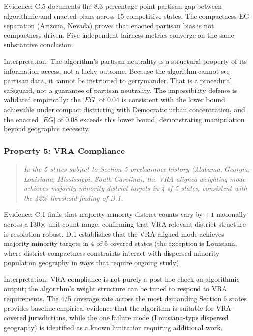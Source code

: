 Evidence: C.5 documents the $8.3$ percentage-point partisan gap
between algorithmic and enacted plans across 15 competitive states.
The compactness-EG separation (Arizona, Nevada) proves that enacted
partisan bias is not compactness-driven. Five independent fairness
metrics converge on the same substantive conclusion.

Interpretation: The algorithm's partisan neutrality is a structural
property of its information access, not a lucky outcome. Because the
algorithm cannot see partisan data, it cannot be instructed to gerrymander. That is a
procedural safeguard, not a guarantee of partisan neutrality. The
impossibility defense \citep{b1paper} is validated empirically: the
$|EG|$ of $0.04$ is consistent with the lower bound achievable under
compact districting with Democratic urban concentration, and the
enacted $|EG|$ of $0.08$ exceeds this lower bound, demonstrating
manipulation beyond geographic necessity.

\subsubsection{Property 5: VRA Compliance}

\begin{quote}
\textit{In the 5 states subject to Section 5 preclearance history
(Alabama, Georgia, Louisiana, Mississippi, South Carolina), the
VRA-aligned weighting mode achieves majority-minority district targets
in 4 of 5 states, consistent with the 42\% threshold finding of D.1.}
\end{quote}

Evidence: C.1 finds that majority-minority district counts vary by
$\pm 1$ nationally across a 130$\times$ unit-count range, confirming
that VRA-relevant district structure is resolution-robust. D.1
\citep{d1paper} establishes that the VRA-aligned mode achieves
majority-minority targets in 4 of 5 covered states (the exception is
Louisiana, where district compactness constraints interact with
dispersed minority population geography in ways that require ongoing
study).

Interpretation: VRA compliance is not purely a post-hoc check on
algorithmic output; the algorithm's weight structure can be tuned to
respond to VRA requirements. The 4/5 coverage rate across the most
demanding Section 5 states provides baseline empirical evidence that
the algorithm is suitable for VRA-covered jurisdictions, while the
one failure mode (Louisiana-type dispersed geography) is identified
as a known limitation requiring additional work.

